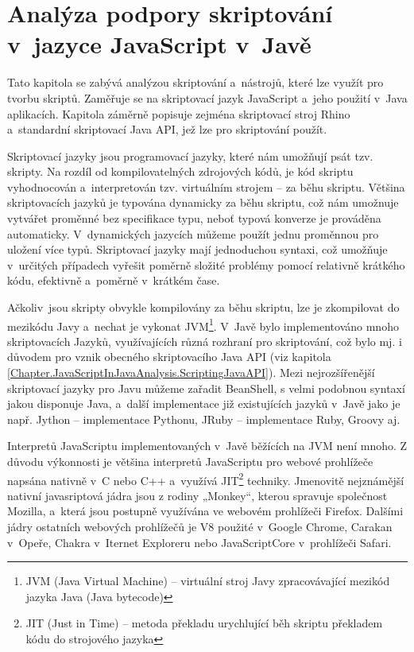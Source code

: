 \chapter{Analýza podpory skriptování v~jazyce JavaScript v~Javě}
\label{Chapter.JavaScriptInJavaAnalysis}

Tato kapitola se zabývá analýzou skriptování a~nástrojů, které lze využít pro tvorbu skriptů. Zaměřuje se na skriptovací jazyk JavaScript a~jeho použití v~Java aplikacích. Kapitola záměrně popisuje zejména skriptovací stroj Rhino a~standardní skriptovací Java API, jež lze pro skriptování použít.

Skriptovací jazyky jsou programovací jazyky, které nám umožňují psát tzv. skripty. Na rozdíl od kompilovatelných zdrojových kódů, je kód skriptu vyhodnocován a~interpretován tzv. virtuálním strojem -- za běhu skriptu. Většina skriptovacích jazyků je typována dynamicky za běhu skriptu, což nám umožnuje vytvářet proměnné bez specifikace typu, neboť typová konverze je prováděna automaticky. V~dynamických jazycích můžeme použít jednu proměnnou pro uložení více typů. Skriptovací jazyky mají jednoduchou syntaxi, což umožňuje v~určitých případech vyřešit poměrně složité problémy pomocí relativně krátkého kódu, efektivně a~poměrně v~krátkém čase.

Ačkoliv~jsou skripty obvykle kompilovány za běhu skriptu, lze je zkompilovat do mezikódu Javy a~nechat je vykonat JVM\footnote{JVM  (Java Virtual Machine) -- virtuální stroj Javy zpracovávající mezikód jazyka Java (Java bytecode)}. V~Javě bylo implementováno mnoho skriptovacích Jazyků, využívajících různá rozhraní pro skriptování, což bylo mj. i důvodem pro vznik obecného skriptovacího Java API (viz kapitola \ref{Chapter.JavaScriptInJavaAnalysis.ScriptingJavaAPI}). Mezi nejrozšířenější skriptovací jazyky pro Javu můžeme zařadit BeanShell, s velmi podobnou syntaxí jakou disponuje Java, a~další implementace již existujících jazyků v~Javě jako je např. Jython -- implementace Pythonu,  JRuby -- implementace Ruby, Groovy aj.

Interpretů JavaScriptu implementovaných v~Javě běžících na JVM není mnoho. Z důvodu výkonnosti je většina interpretů JavaScriptu pro webové prohlížeče napsána nativně v~C nebo C++ a~využívá JIT\footnote{JIT (Just in Time) -- metoda překladu urychlující běh skriptu překladem kódu do strojového jazyka} techniky. Jmenovitě nejznámější nativní javasriptová jádra jsou z rodiny „Monkey“, kterou spravuje společnost Mozilla, a~která jsou postupně využívána ve webovém prohlížeči Firefox. Dalšími jádry ostatních webových prohlížečů je V8 použité v~Google Chrome, Carakan v~Opeře, Chakra v~Iternet Exploreru nebo JavaScriptCore v~prohlížeči Safari.


